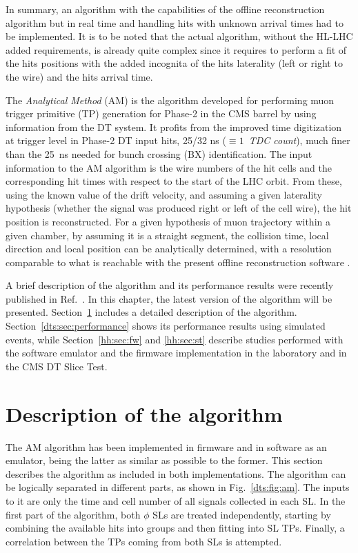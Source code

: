 \documentclass[../main.tex]{subfiles}
\begin{document}
In summary, an algorithm with the capabilities of the offline reconstruction algorithm but in real time and handling hits with unknown arrival times had to be implemented. It is to be noted that the actual algorithm, without the HL-LHC added requirements, is already quite complex since it requires to perform a fit of the hits positions with the added incognita of the hits laterality (left or right to the wire) and the hits arrival time.

The \textit{Analytical Method} (AM) \cite{dts:intro:am} is the algorithm developed for performing muon trigger primitive (TP) generation for Phase-2 in the CMS barrel by using information from the DT system. It profits from the improved time digitization at trigger level in Phase-2 DT input hits, 25/32 ns ($\equiv1$~\textit{TDC count}), much finer than the 25~ns needed for bunch crossing (BX) identification. The input information to the AM algorithm is the wire numbers of the hit cells and the corresponding hit times with respect to the start of the LHC orbit. From these, using the known value of the drift velocity, and assuming a given laterality hypothesis (whether the signal was produced right or left of the cell wire), the hit position is reconstructed. For a given hypothesis of muon trajectory within a given chamber, by assuming it is a straight segment, the collision time, local direction and local position can be analytically determined, with a resolution comparable to what is reachable with the present offline reconstruction software \cite{intro:id:muon_7tev}.

A brief description of the algorithm and its performance results were recently published in Ref.~\cite{dts:intro:am}. In this chapter, the latest version of the algorithm will be presented. Section~\ref{sec:dts:description} includes a detailed description of the algorithm. Section~\ref{dts:sec:performance} shows its performance results using simulated events, while Section~\ref{hh:sec:fw} and \ref{hh:sec:st} describe studies performed with the software emulator and the firmware implementation in the laboratory and in the CMS DT Slice Test.



\section{Description of the algorithm}
\label{sec:dts:description}

The AM algorithm has been implemented in firmware and in software as an emulator, being the latter as similar as possible to the former. This section describes the algorithm as included in both implementations. The algorithm can be logically separated in different parts, as shown in Fig.~\ref{dts:fig:am}. The inputs to it are only the time and cell number of all signals collected in each SL. In the first part of the algorithm, both $\phi$ SLs are treated independently, starting by combining the available hits into groups and then fitting into SL TPs. Finally, a correlation between the TPs coming from both SLs is attempted. 
\end{document}
